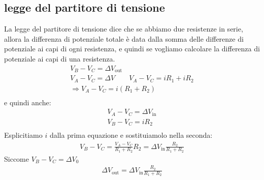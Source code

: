 \documentclass[a4paper, oneside]{article}
\begin{document}
    \subsection{legge del partitore di tensione}
    \begin{figure}
    \centering
    \end{figure}
    La legge del partitore di tensione dice che se abbiamo due resistenze in serie, allora la differenza di potenziale totale è data dalla somma delle differenze di potenziale ai capi di ogni resistenza, e quindi se vogliamo calcolare la differenza di potenziale ai capi di una resistenza.
    \begin{gather*}
        V_B - V_C = \Delta V_\text{out}\\
        V_A - V_C = \Delta V \qquad V_A - V_C = iR_1 + iR_2 \\
        \Rightarrow V_A - V_C = i (R_1 + R_2) \\
    \end{gather*}
    e quindi anche:
    \begin{gather*}
        V_A - V_C = \Delta V_\text{in} \\
        V_B - V_C = i R_2\\
    \end{gather*}
    Esplicitiamo $i$ dalla prima equazione e sostituiamolo nella seconda:
    \begin{gather*}
        V_B - V_C = \frac{V_A - V_C}{R_1 + R_2} R_2 = \Delta V_\text{in} \frac{R_2}{R_1 + R_2}
    \end{gather*}
    Siccome $V_B - V_C = \Delta V_0$
    \begin{gather*}
        \Delta V_\text{out} = \Delta V_\text{in} \frac{R_2}{R_1 + R_2}
    \end{gather*}
\end{document}
